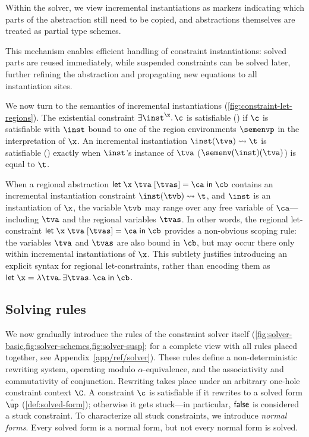 \documentclass[acmsmall,screen,nonacm%
\Anonymous{,anonymous}{}%
\Final{}{,review}%
]{acmart}
\begin{document}

%
Within the solver, we view incremental instantiations as markers indicating
which parts of the abstraction still need to be copied, and abstractions
themselves are treated as partial type schemes.


This mechanism enables efficient handling of constraint instantiations: solved
parts are reused immediately, while suspended constraints can be solved later,
further refining the abstraction and propagating new equations to all
instantiation sites.


We now turn to the semantics of incremental instantiations
(\cref{fig:constraint-let-regions}). The existential constraint $\cexistsi
\inst \x \c$ is satisfiable () if $\c$ is satisfiable with
$\inst$ bound to one of the region environments $\semenvp$ in the
interpretation of $\x$.
%
An incremental instantiation $\cpinst \inst \tv \t$ is satisfiable
() exactly when $\inst$'s instance of $\tv$
(\ie $\semenv(\inst)(\tv)$) is equal to $\t$.


When a regional abstraction $\cletr \x \tv \tvs \ca \cb$ contains an
incremental instantiation constraint $\cpinst \inst \tvb \t$, and $\inst$ is
an instantiation of $\x$, the variable $\tvb$ may range over any free variable
of $\ca$---including $\tv$ and the regional variables $\tvs$. In other
words, the regional let-constraint ${\cletr \x \tv \tvs \ca \cb}$ provides a
non-obvious scoping rule: the variables $\tv$ and $\tvs$ are also bound in
$\cb$, but may occur there only within incremental instantiations of
$\x$. This subtlety justifies introducing an explicit syntax for regional
let-constraints, rather than encoding them as $\clet \x \tv {\exi \tvs \ca}
\cb$.

\subsection{Solving rules}


We now gradually introduce the rules of the constraint solver itself
(\cref {fig:solver-basic,fig:solver-schemes,fig:solver-susp};
for a complete view with all rules placed together, see Appendix~\cref{app/ref/solver}).
These rules define a non-deterministic rewriting
system, operating modulo $\alpha$-equivalence, and the associativity and
commutativity of conjunction. Rewriting takes place under an arbitrary
one-hole constraint context $\C$.
%
A constraint $\c$ is satisfiable if it rewrites to a solved form $\hat\up$
(\cref{def:solved-form}); otherwise it gets stuck---in particular, $\mathsf{false}$ is
considered a stuck constraint. To characterize all stuck constraints, we 
introduce \emph{normal forms}.
%
Every solved form is a normal form, but not every normal form is solved. 
\end{document}
